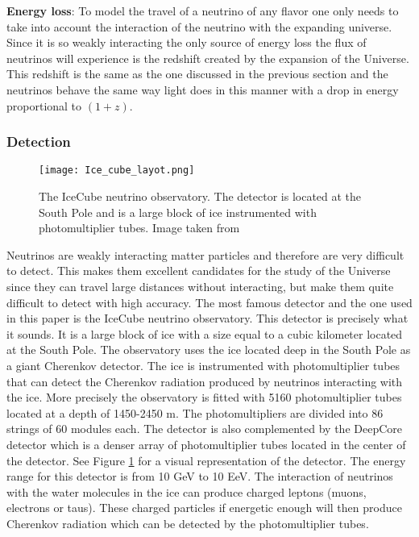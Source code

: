 \textbf{Energy loss}:
To model the travel of a neutrino of any flavor one only needs to take into account the interaction of the neutrino with the expanding universe. Since it is so weakly interacting the only 
source of energy loss the flux of neutrinos will experience is the redshift created by the expansion of the Universe. This redshift is the same as the one discussed in the previous section and the neutrinos 
behave the same way light does in this manner with a drop in energy proportional to $(1+z)$.



 

\subsubsection{Detection}
\begin{figure}
    \centering
    \texttt{[image: Ice\_cube\_layot.png]}
    \caption{The IceCube neutrino observatory. The detector is located at the South Pole and is a large block of ice instrumented with photomultiplier tubes. Image taken from \cite{Andeen_2019}}
    \label{fig:Ice_cube}
\end{figure}

Neutrinos are weakly interacting matter particles and therefore are very difficult to detect. This makes them excellent candidates for the study of the Universe since they can travel large distances without interacting, but make them 
quite difficult to detect with high accuracy. The most famous detector and the one used in this paper is the IceCube neutrino observatory. This detector is precisely what it sounds. It is a large block of ice with a size equal to a cubic kilometer located at the South Pole.
The observatory uses the ice located deep in the South Pole as a giant Cherenkov detector. The ice is instrumented with photomultiplier tubes that can detect the Cherenkov radiation produced by neutrinos interacting with the ice. 
More precisely the observatory is fitted with 5160 photomultiplier tubes located at a depth of 1450-2450 m. The photomultipliers are divided into 86 strings of 60 modules each. The detector is also complemented by the DeepCore detector which is a denser array of photomultiplier tubes located in the center of the detector. See Figure \ref{fig:Ice_cube} for a visual representation of the detector.
The energy range for this detector is from 10 GeV to 10 EeV. The interaction of neutrinos with the water molecules in the ice can produce charged leptons (muons, electrons or taus). These charged particles if energetic enough will then produce Cherenkov radiation which can be detected by the photomultiplier tubes.


